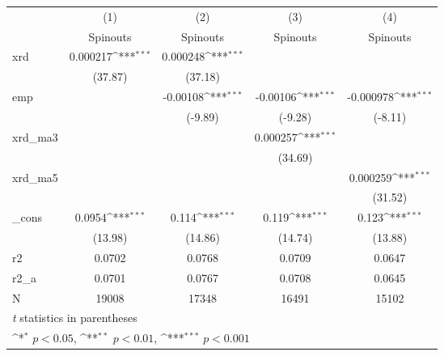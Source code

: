 {
\def\sym#1{\ifmmode^{#1}\else\(^{#1}\)\fi}
\begin{tabular}{l*{4}{c}}
\hline\hline
            &\multicolumn{1}{c}{(1)}&\multicolumn{1}{c}{(2)}&\multicolumn{1}{c}{(3)}&\multicolumn{1}{c}{(4)}\\
            &\multicolumn{1}{c}{Spinouts}&\multicolumn{1}{c}{Spinouts}&\multicolumn{1}{c}{Spinouts}&\multicolumn{1}{c}{Spinouts}\\
\hline
xrd         &    0.000217\sym{***}&    0.000248\sym{***}&                     &                     \\
            &     (37.87)         &     (37.18)         &                     &                     \\
[1em]
emp         &                     &    -0.00108\sym{***}&    -0.00106\sym{***}&   -0.000978\sym{***}\\
            &                     &     (-9.89)         &     (-9.28)         &     (-8.11)         \\
[1em]
xrd\_ma3     &                     &                     &    0.000257\sym{***}&                     \\
            &                     &                     &     (34.69)         &                     \\
[1em]
xrd\_ma5     &                     &                     &                     &    0.000259\sym{***}\\
            &                     &                     &                     &     (31.52)         \\
[1em]
\_cons      &      0.0954\sym{***}&       0.114\sym{***}&       0.119\sym{***}&       0.123\sym{***}\\
            &     (13.98)         &     (14.86)         &     (14.74)         &     (13.88)         \\
\hline
r2          &      0.0702         &      0.0768         &      0.0709         &      0.0647         \\
r2\_a        &      0.0701         &      0.0767         &      0.0708         &      0.0645         \\
N           &       19008         &       17348         &       16491         &       15102         \\
\hline\hline
\multicolumn{5}{l}{\footnotesize \textit{t} statistics in parentheses}\\
\multicolumn{5}{l}{\footnotesize \sym{*} \(p<0.05\), \sym{**} \(p<0.01\), \sym{***} \(p<0.001\)}\\
\end{tabular}
}
